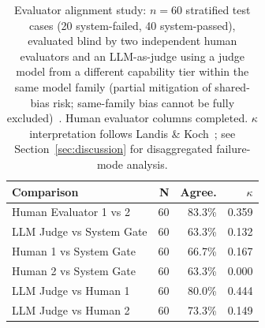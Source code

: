 \begin{table}[htbp]
\renewcommand{\arraystretch}{1.2}
\centering
\scriptsize
\setlength{\tabcolsep}{2.5pt}
\caption{Evaluator alignment study: $n=60$ stratified test cases (20 system-failed, 40 system-passed), evaluated blind by two independent human evaluators and an LLM-as-judge using a judge model from a different capability tier within the same model family (partial mitigation of shared-bias risk; same-family bias cannot be fully excluded)~\cite{zheng2023judging}. Human evaluator columns completed. $\kappa$ interpretation follows Landis \& Koch~\cite{landis1977kappa}; see Section~\ref{sec:discussion} for disaggregated failure-mode analysis.}
\label{tab:human_alignment}
\begin{tabular}{p{3.0cm}rrr}
\toprule
\textbf{Comparison} & \textbf{N} & \textbf{Agree.} & \textbf{$\kappa$} \\
\midrule
Human Evaluator 1 vs 2 & 60 & 83.3\% & 0.359 \\
LLM Judge vs System Gate & 60 & 63.3\% & 0.132 \\
Human 1 vs System Gate & 60 & 66.7\% & 0.167 \\
Human 2 vs System Gate & 60 & 63.3\% & 0.000 \\
LLM Judge vs Human 1 & 60 & 80.0\% & 0.444 \\
LLM Judge vs Human 2 & 60 & 73.3\% & 0.149 \\
\bottomrule
\end{tabular}
\setlength{\tabcolsep}{6pt}
\end{table}

